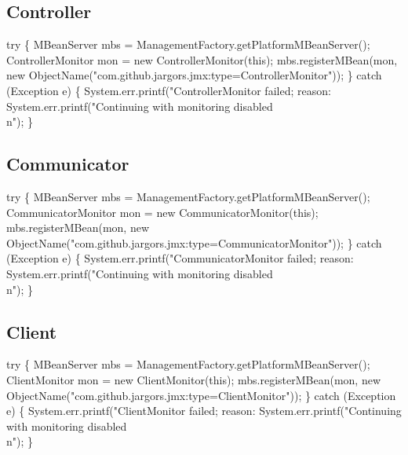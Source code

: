 \subsection{Controller}
\nwenddocs{}\endmoddef{}
try \{
  MBeanServer mbs = ManagementFactory.getPlatformMBeanServer();
  ControllerMonitor mon = new ControllerMonitor(this);
  mbs.registerMBean(mon, new ObjectName("com.github.jargors.jmx:type=ControllerMonitor"));
\} catch (Exception e) \{
  System.err.printf("ControllerMonitor failed; reason: %
  System.err.printf("Continuing with monitoring disabled\\n");
\}
\nwendcode{}\nwdocspar

\subsection{Communicator}
\nwenddocs{}\endmoddef{}
try \{
  MBeanServer mbs = ManagementFactory.getPlatformMBeanServer();
  CommunicatorMonitor mon = new CommunicatorMonitor(this);
  mbs.registerMBean(mon, new ObjectName("com.github.jargors.jmx:type=CommunicatorMonitor"));
\} catch (Exception e) \{
  System.err.printf("CommunicatorMonitor failed; reason: %
  System.err.printf("Continuing with monitoring disabled\\n");
\}
\nwendcode{}\nwdocspar

\subsection{Client}
\nwenddocs{}\endmoddef{}
try \{
  MBeanServer mbs = ManagementFactory.getPlatformMBeanServer();
  ClientMonitor mon = new ClientMonitor(this);
  mbs.registerMBean(mon, new ObjectName("com.github.jargors.jmx:type=ClientMonitor"));
\} catch (Exception e) \{
  System.err.printf("ClientMonitor failed; reason: %
  System.err.printf("Continuing with monitoring disabled\\n");
\}
\nwendcode{}\nwdocspar


